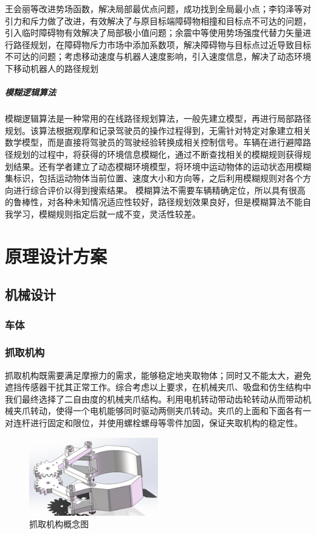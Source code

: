 \documentclass{report}
\begin{document}
王会丽等改进势场函数，解决局部最优点问题，成功找到全局最小点；李钧泽等对引力和斥力做了改进，有效解决了与原目标端障碍物相撞和目标点不可达的问题，引入临时障碍物有效解决了局部极小值问题；余震中等使用势场强度代替力矢量进行路径规划，在障碍物斥力市场中添加系数项，解决障碍物与目标点过近导致目标不可达的问题；考虑移动速度与机器人速度影响，引入速度信息，解决了动态环境下移动机器人的路径规划\cite{jh5}

\paragraph{模糊逻辑算法}

模糊逻辑算法是一种常用的在线路径规划算法，一般先建立模型，再进行局部路径规划。该算法根据观摩和记录驾驶员的操作过程得到，无需针对特定对象建立相关数学模型，而是直接将驾驶员的驾驶经验转换成相关控制信号。车辆在进行避障路径规划的过程中，将获得的环境信息模糊化，通过不断查找相关的模糊规则获得规划结果。还有学者建立了动态模糊环境模型，将环境中运动物体的运动状态用模糊集标识，包括运动物体当前位置、速度大小和方向等，之后利用模糊规则对各个方向进行综合评价以得到搜索结果。
模糊算法不需要车辆精确定位，所以具有很高的鲁棒性，对各种未知情况适应性较好，路径规划效果良好，但是模糊算法不能自我学习，模糊规则指定后就一成不变，灵活性较差\cite{jh6}。

\chapter{原理设计方案}

\section{机械设计}
\subsection{车体}
\label{subsec:label}
\subsection{抓取机构}
抓取机构既需要满足摩擦力的需求，能够稳定地夹取物体；同时又不能太大，避免遮挡传感器干扰其正常工作。综合考虑以上要求，在机械夹爪、吸盘和仿生结构中我们最终选择了二自由度的机械夹爪结构。利用电机转动带动齿轮转动从而带动机械夹爪转动，使得一个电机能够同时驱动两侧夹爪转动。夹爪的上面和下面各有一对连杆进行固定和限位，并使用螺栓螺母等零件加固，保证夹取机构的稳定性。
\begin{figure}[ht]
  \centering
  \includegraphics[width=0.5\textwidth]{figures/pickup.png}
  \caption{抓取机构概念图 }
\end{figure}
\end{document}
